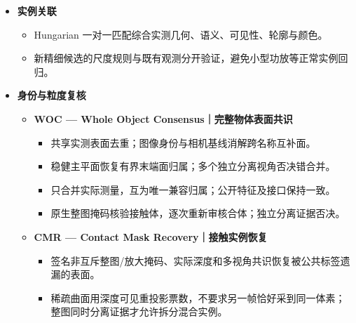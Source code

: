 \documentclass[UTF8,fontset=fandol]{ctexart}
\begin{document}
\begin{itemize}
\begin{itemize}
\begin{itemize}
\item 用光轴深度、内参与位姿反投影；只有声明正确米制 Z-up 的 Hypersim 才启用对应地面规则。


\item 多帧背景支持的地面及低平台过滤；背景几何仍保留在背景输出中。

\end{itemize}

\item \textbf{实例关联}


\begin{itemize}
\item Hungarian 一对一匹配综合实测几何、语义、可见性、轮廓与颜色。


\item 新精细候选的尺度规则与既有观测分开验证，避免小型功放等正常实例回归。

\end{itemize}

\item \textbf{身份与粒度复核}


\begin{itemize}
\item \textbf{WOC — Whole Object Consensus｜完整物体表面共识}


\begin{itemize}
\item 共享实测表面去重；图像身份与相机基线消解跨名称互补面。


\item 稳健主平面恢复有界末端面归属；多个独立分离视角否决错合并。


\item 只合并实际测量，互为唯一兼容归属；公开特征及接口保持一致。


\item 原生整图掩码核验接触体，逐次重新审核合体；独立分离证据否决。

\end{itemize}

\item \textbf{CMR — Contact Mask Recovery｜接触实例恢复}


\begin{itemize}
\item 签名非互斥整图/放大掩码、实际深度和多视角共识恢复被公共标签遗漏的表面。


\item 稀疏曲面用深度可见重投影票数，不要求另一帧恰好采到同一体素；整图同时分离证据才允许拆分混合实例。



\end{itemize}
\end{itemize}
\end{itemize}
\end{itemize}
\end{document}
